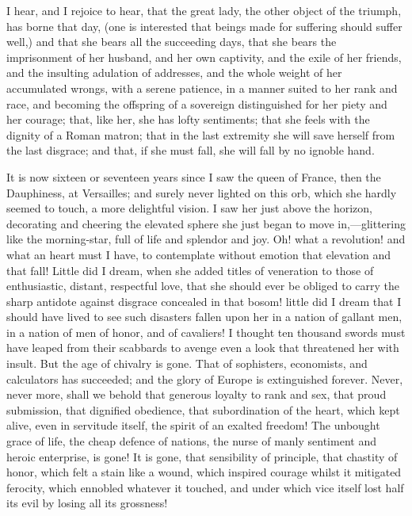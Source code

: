 I hear, and I rejoice to hear, that the great lady, the other object of the triumph, has borne that day, (one is interested that beings made for suffering should suffer well,) and that she bears all the succeeding days, that she bears the imprisonment of her husband, and her own captivity, and the exile of her friends, and the insulting adulation of addresses, and the whole weight of her accumulated wrongs, with a serene patience, in a manner suited to her rank and race, and becoming the offspring of a sovereign distinguished for her piety and her courage; that, like her, she has lofty sentiments; that she feels with the dignity of a Roman matron; that in the last extremity she will save herself from the last disgrace; and that, if she must fall, she will fall by no ignoble hand.

It is now sixteen or seventeen years since I saw the queen of France, then the Dauphiness, at Versailles; and surely never lighted on this orb, which she hardly seemed to touch, a more delightful vision. I saw her just above the horizon, decorating and cheering the elevated sphere she just began to move in,—glittering like the morning-star, full of life and splendor and joy. Oh! what a revolution! and what an heart must I have, to contemplate without emotion that elevation and that fall! Little did I dream, when she added titles of veneration to those of enthusiastic, distant, respectful love, that she should ever be obliged to carry the sharp antidote against disgrace concealed in that bosom! little did I dream that I should have lived to see such disasters fallen upon her in a nation of gallant men, in a nation of men of honor, and of cavaliers! I thought ten thousand swords must have leaped from their scabbards to avenge even a look that threatened her with insult. But the age of chivalry is gone. That of sophisters, economists, and calculators has succeeded; and the glory of Europe is extinguished forever. Never, never more, shall we behold that generous loyalty to rank and sex, that proud submission, that dignified obedience, that subordination of the heart, which kept alive, even in servitude itself, the spirit of an exalted freedom! The unbought grace of life, the cheap defence of nations, the nurse of manly sentiment and heroic enterprise, is gone! It is gone, that sensibility of principle, that chastity of honor, which felt a stain like a wound, which inspired courage whilst it mitigated ferocity, which ennobled whatever it touched, and under which vice itself lost half its evil by losing all its grossness!

